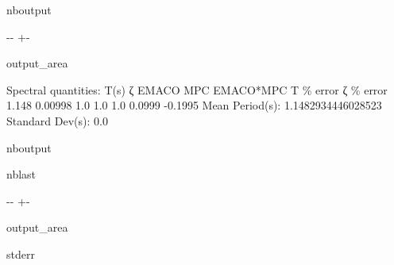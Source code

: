 \documentclass[letterpaper,10pt,english]{sphinxmanual}
\begin{document}
\begin{sphinxuseclass}{nboutput}
{

\kern-\sphinxverbatimsmallskipamount\kern-\baselineskip
\kern+\FrameHeightAdjust\kern-\fboxrule
\vspace{\nbsphinxcodecellspacing}

\begin{sphinxuseclass}{output_area}
\begin{sphinxuseclass}{}


\begin{sphinxVerbatim}[commandchars=\\\{\}]
Spectral quantities:
       T(s)        ζ        EMACO        MPC     EMACO*MPC          T \% error    ζ \% error
      1.148      0.00998    1.0        1.0        1.0          0.0999       -0.1995
Mean Period(s): 1.1482934446028523
Standard Dev(s): 0.0
\end{sphinxVerbatim}



\end{sphinxuseclass}
\end{sphinxuseclass}
}

\end{sphinxuseclass}
\begin{sphinxuseclass}{nboutput}
\begin{sphinxuseclass}{nblast}
{

\kern-\sphinxverbatimsmallskipamount\kern-\baselineskip
\kern+\FrameHeightAdjust\kern-\fboxrule
\vspace{\nbsphinxcodecellspacing}

\begin{sphinxuseclass}{output_area}
\begin{sphinxuseclass}{stderr}


\begin{sphinxVerbatim}[commandchars=\\\{\}]

\end{sphinxVerbatim}

\end{sphinxuseclass}
\end{sphinxuseclass}
}

\end{sphinxuseclass}
\end{sphinxuseclass}
\end{document}
